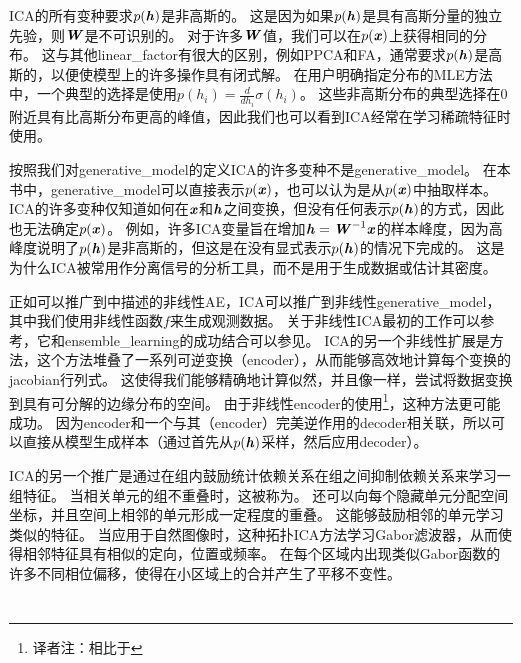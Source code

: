 \gls{ICA}的所有变种要求$p(\boldsymbol{\mathit{h}})$是非高斯的。
这是因为如果$p(\boldsymbol{\mathit{h}})$是具有高斯分量的独立先验，则$\boldsymbol{\mathit{W}}$是不可识别的。
对于许多$\boldsymbol{\mathit{W}}$值，我们可以在$p(\boldsymbol{\mathit{x}})$上获得相同的分布。 
这与其他\gls{linear_factor}有很大的区别，例如\gls{PPCA}和\gls{FA}，通常要求$p(\boldsymbol{\mathit{h}})$是高斯的，以便使模型上的许多操作具有闭式解。
在用户明确指定分布的\gls{MLE}方法中，一个典型的选择是使用$p(h_i) = \frac{d}{dh_i}\sigma(h_i)$。
这些非高斯分布的典型选择在$0$附近具有比高斯分布更高的峰值，因此我们也可以看到\gls{ICA}经常在学习稀疏特征时使用。




按照我们对\gls{generative_model}的定义\gls{ICA}的许多变种不是\gls{generative_model}。
 在本书中，\gls{generative_model}可以直接表示$p(\boldsymbol{\mathit{x}})$，也可以认为是从$p(\boldsymbol{\mathit{x}})$中抽取样本。
\gls{ICA}的许多变种仅知道如何在$\boldsymbol{\mathit{x}}$和$\boldsymbol{\mathit{h}}$之间变换，但没有任何表示$p(\boldsymbol{\mathit{h}})$的方式，因此也无法确定$p(\boldsymbol{\mathit{x}})$。
例如，许多\gls{ICA}变量旨在增加$\boldsymbol{\mathit{h}} = \boldsymbol{\mathit{W}}^{-1}\boldsymbol{\mathit{x}}$的样本峰度，因为高峰度说明了$p(\boldsymbol{\mathit{h}})$是非高斯的，但这是在没有显式表示$p(\boldsymbol{\mathit{h}})$的情况下完成的。
这是为什么\gls{ICA}被常用作分离信号的分析工具，而不是用于生成数据或估计其密度。


正如可以推广到中描述的非线性\gls{AE}，\gls{ICA}可以推广到非线性\gls{generative_model}，其中我们使用非线性函数$f$来生成观测数据。
关于非线性\gls{ICA}最初的工作可以参考\citet{hyvarinen1999nonlinear}，它和\gls{ensemble_learning}的成功结合可以参见\citet{roberts2001independent,lappalainen2000nonlinear}。
\gls{ICA}的另一个非线性扩展是方法\citep{Dinh-et-al-arxiv2014}，这个方法堆叠了一系列可逆变换（\gls{encoder}），从而能够高效地计算每个变换的\gls{jacobian}行列式。
这使得我们能够精确地计算似然，并且像一样，尝试将数据变换到具有可分解的边缘分布的空间。
由于非线性\gls{encoder}的使用\footnote{译者注：相比于}，这种方法更可能成功。
因为\gls{encoder}和一个与其（\gls{encoder}）完美逆作用的\gls{decoder}相关联，所以可以直接从模型生成样本（通过首先从$p(\boldsymbol{\mathit{h}})$采样，然后应用\gls{decoder}）。


\gls{ICA}的另一个推广是通过在组内鼓励统计依赖关系在组之间抑制依赖关系来学习一组特征。
当相关单元的组不重叠时，这被称为。
还可以向每个隐藏单元分配空间坐标，并且空间上相邻的单元形成一定程度的重叠。
这能够鼓励相邻的单元学习类似的特征。
当应用于自然图像时，这种拓扑\gls{ICA}方法学习Gabor滤波器，从而使得相邻特征具有相似的定向，位置或频率。
在每个区域内出现类似Gabor函数的许多不同相位偏移，使得在小区域上的合并产生了平移不变性。


\section{}
\label{sec:slow_feature_analysis}


